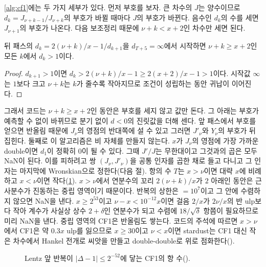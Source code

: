 \cref{alg:cf1}에는 두 가지 세부가 있다. 먼저 부호를 보자. 큰 차수의 $J$는 양수이므로 $d_k=J_{\nu+k-1}/J_{\nu+k}$의 부호가 바뀔 때마다 $J$의 부호가 바뀐다. 음수인 $d_k$의 수를 세면 $J_{\nu+1}$의 부호가 나온다. 다음 보조정리 때문에 $\nu+k<x+2$인 차수만 세면 된다.

\begin{lemma}
\label{lem:cf1-positive}
뒤 패스의 $d_k=2(\nu+k)/x-1/d_{k+1}$을 $d_{T+5}=\infty$에서 시작하면 $\nu+k\ge x+2$인 모든 $k$에서 $d_k>1$이다.
\end{lemma}

\begin{proof}
$d_{k+1}>1$이면 $d_k>2(\nu+k)/x-1\ge2(x+2)/x-1>1$이다. 시작값 $\infty$는 $1$보다 크고 $\nu+k$는 $k$가 줄수록 작아지므로 조건이 성립하는 동안 귀납이 이어진다.
\end{proof}

\noindent 그래서 코드는 $\nu+k\ge x+2$인 동안은 부호를 세지 않고 값만 돈다. 그 아래는 부호가 예측할 수 없이 바뀌므로 분기 없이 $d<0$의 진릿값을 더해 센다. 앞 패스에서 부호를 얻으면 반올림 때문에 $J_\nu$의 영점의 반대쪽에 설 수 있고 그러면 $J'_\nu$와 $Y_\nu$의 부호가 뒤집힌다. 둘째로 이 알고리즘은 비 자체를 만들지 않는다. $x$가 $J_\nu$의 영점에 가장 가까운 double이면 $d_1$이 정확히 $0$이 될 수 있다. 그때 $J'/J$는 무한대이고 그것과의 곱은 모두 NaN이 된다. 이를 피하려고 쌍 $(J_\nu,J'_\nu)$을 공통 인자를 곱한 채로 들고 다니고 그 인자는 마지막에 Wronskian으로 정한다(다음 절). 항의 수 $T$는 $x>\nu$이면 대략 $x$에 비례하고 $x<\nu$이면 작다(\cref{fig:cf1-terms}). $x>\nu$에서 연분수의 꼬리 $2(\nu+k)/x$가 $2$ 아래인 동안은 근사분수가 진동하는 중립 영역이기 때문이다. 반복의 상한은 $=10^7$이고 그 안에 수렴하지 않으면 NaN을 낸다. $x\ge2^{53}$이고 $\nu-x<10^{-12}x$이면 걸음 $2/x$가 $2\nu/x$의 반 ulp보다 작아 계수가 사실상 상수 $2+\delta$인 연분수가 되고 수렴에 $18/\sqrt\delta$ 항쯤이 필요하므로 미리 NaN을 낸다. 중립 영역의 CF1은 반올림도 쌓는다. 코드의 주석에 따르면 $x>\nu$에서 CF1은 약 $0.3x$ ulp를 잃으므로 $x\ge30$이고 $\nu<x$이면 stardust는 CF1 대신 작은 차수에서 Hankel 전개로 씨앗을 만들고 double-double로 위로 점화한다().

\begin{figure}[htbp]
\centering
{}
\caption{Lentz 앞 반복이 $|\Delta-1|\le2^{-52}$에 닿는 CF1의 항 수().}
\label{fig:cf1-terms}
\end{figure}


